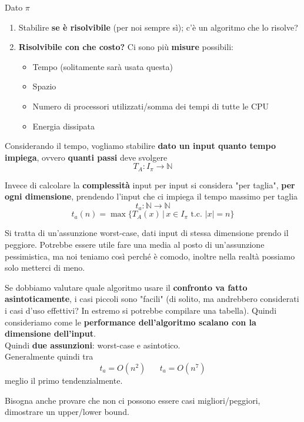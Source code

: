 Dato $\pi$
\begin{enumerate}
	\item Stabilire \textbf{se è risolvibile} (per noi sempre sì); c'è un algoritmo che lo risolve?
	
	\item \textbf{Risolvibile con che costo?} Ci sono più \textbf{misure} possibili:
	\begin{itemize}
		\item Tempo (solitamente sarà usata questa)
		\item Spazio
		\item Numero di processori utilizzati/somma dei tempi di tutte le CPU
		\item Energia dissipata
	\end{itemize}
\end{enumerate}

Considerando il tempo, vogliamo stabilire \textbf{dato un input quanto tempo impiega}, ovvero \textbf{quanti passi} deve svolgere
$$ T_A : I_\pi \rightarrow \mathbb{N}$$

Invece di calcolare la \textbf{complessità} input per input si considera "per taglia", \textbf{per ogni dimensione}, prendendo l'input che ci impiega il tempo massimo per taglia
$$ t_a : \mathbb{N} \rightarrow \mathbb{N}$$
$$ t_a (n) = \max \{T_A (x) \, | \, x \in I_\pi \text{ t.c. } |x| = n\} $$

Si tratta di un'assunzione worst-case, dati input di stessa dimensione prendo il peggiore. Potrebbe essere utile fare una media al posto di un'assunzione pessimistica, ma noi teniamo così perché è comodo, inoltre nella realtà possiamo solo metterci di meno.\\

\newpage

Se dobbiamo valutare quale algoritmo usare il \textbf{confronto va fatto asintoticamente}, i casi piccoli sono "facili" (di solito, ma andrebbero considerati i casi d'uso effettivi? In estremo si potrebbe compilare una tabella). Quindi consideriamo come le \textbf{performance dell'algoritmo scalano con la dimensione dell'input}.\\

Quindi \textbf{due assunzioni}: worst-case e asintotico. \\

Generalmente quindi tra
$$ t_a = O (n^2) \;\;\;\;\;\; t_a = O(n^7)$$
meglio il primo tendenzialmente.

Bisogna anche provare che non ci possono essere casi migliori/peggiori, dimostrare un upper/lower bound.\\


